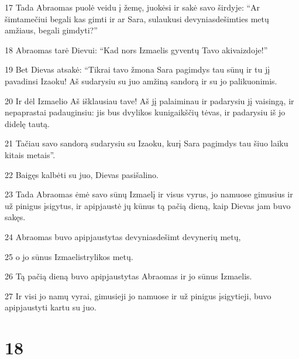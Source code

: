 \par 17 Tada Abraomas puolė veidu į žemę, juokėsi ir sakė savo širdyje: “Ar šimtamečiui begali kas gimti ir ar Sara, sulaukusi devyniasdešimties metų amžiaus, begali gimdyti?” 
\par 18 Abraomas tarė Dievui: “Kad nors Izmaelis gyventų Tavo akivaizdoje!” 
\par 19 Bet Dievas atsakė: “Tikrai tavo žmona Sara pagimdys tau sūnų ir tu jį pavadinsi Izaoku! Aš sudarysiu su juo amžiną sandorą ir su jo palikuonimis. 
\par 20 Ir dėl Izmaelio Aš išklausiau tave! Aš jį palaiminau ir padarysiu jį vaisingą, ir nepaprastai padauginsiu: jis bus dvylikos kunigaikščių tėvas, ir padarysiu iš jo didelę tautą. 
\par 21 Tačiau savo sandorą sudarysiu su Izaoku, kurį Sara pagimdys tau šiuo laiku kitais metais”. 
\par 22 Baigęs kalbėti su juo, Dievas pasišalino. 
\par 23 Tada Abraomas ėmė savo sūnų Izmaelį ir visus vyrus, jo namuose gimusius ir už pinigus įsigytus, ir apipjaustė jų kūnus tą pačią dieną, kaip Dievas jam buvo sakęs. 
\par 24 Abraomas buvo apipjaustytas devyniasdešimt devynerių metų, 
\par 25 o jo sūnus Izmaelis­trylikos metų. 
\par 26 Tą pačią dieną buvo apipjaustytas Abraomas ir jo sūnus Izmaelis. 
\par 27 Ir visi jo namų vyrai, gimusieji jo namuose ir už pinigus įsigytieji, buvo apipjaustyti kartu su juo.



\chapter{18}


